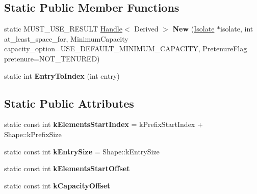 \subsection*{Static Public Member Functions}
\begin{DoxyCompactItemize}
\item 
static M\+U\+S\+T\+\_\+\+U\+S\+E\+\_\+\+R\+E\+S\+U\+LT \hyperlink{classv8_1_1internal_1_1_handle}{Handle}$<$ Derived $>$ {\bfseries New} (\hyperlink{classv8_1_1internal_1_1_isolate}{Isolate} $\ast$isolate, int at\+\_\+least\+\_\+space\+\_\+for, Minimum\+Capacity capacity\+\_\+option=U\+S\+E\+\_\+\+D\+E\+F\+A\+U\+L\+T\+\_\+\+M\+I\+N\+I\+M\+U\+M\+\_\+\+C\+A\+P\+A\+C\+I\+TY, Pretenure\+Flag pretenure=N\+O\+T\+\_\+\+T\+E\+N\+U\+R\+ED)\hypertarget{classv8_1_1internal_1_1_hash_table_a5c1574b25a07f84761ee8f420102dbd5}{}\label{classv8_1_1internal_1_1_hash_table_a5c1574b25a07f84761ee8f420102dbd5}

\item 
static int {\bfseries Entry\+To\+Index} (int entry)\hypertarget{classv8_1_1internal_1_1_hash_table_a82a15f40b786548448a96cde7486459e}{}\label{classv8_1_1internal_1_1_hash_table_a82a15f40b786548448a96cde7486459e}

\end{DoxyCompactItemize}
\subsection*{Static Public Attributes}
\begin{DoxyCompactItemize}
\item 
static const int {\bfseries k\+Elements\+Start\+Index} = k\+Prefix\+Start\+Index + Shape\+::k\+Prefix\+Size\hypertarget{classv8_1_1internal_1_1_hash_table_a2e2b830482a0692ffc3ffd22dcfa07df}{}\label{classv8_1_1internal_1_1_hash_table_a2e2b830482a0692ffc3ffd22dcfa07df}

\item 
static const int {\bfseries k\+Entry\+Size} = Shape\+::k\+Entry\+Size\hypertarget{classv8_1_1internal_1_1_hash_table_abdf5da3cbf7a54499e1c64e75de43857}{}\label{classv8_1_1internal_1_1_hash_table_abdf5da3cbf7a54499e1c64e75de43857}

\item 
static const int {\bfseries k\+Elements\+Start\+Offset}
\item 
static const int {\bfseries k\+Capacity\+Offset}
\end{DoxyCompactItemize}

